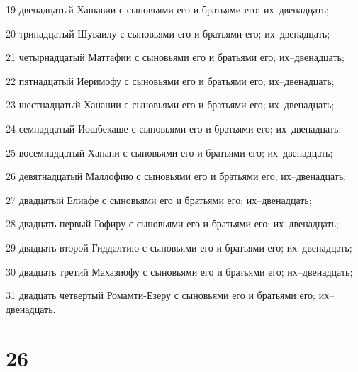 \par 19 двенадцатый Хашавии с сыновьями его и братьями его; их--двенадцать;
\par 20 тринадцатый Шуваилу с сыновьями его и братьями его; их--двенадцать;
\par 21 четырнадцатый Маттафии с сыновьями его и братьями его; их--двенадцать;
\par 22 пятнадцатый Иеримофу с сыновьями его и братьями его; их--двенадцать;
\par 23 шестнадцатый Ханании с сыновьями его и братьями его; их--двенадцать;
\par 24 семнадцатый Иошбекаше с сыновьями его и братьями его; их--двенадцать;
\par 25 восемнадцатый Ханани с сыновьями его и братьями его; их--двенадцать;
\par 26 девятнадцатый Маллофию с сыновьями его и братьями его; их--двенадцать;
\par 27 двадцатый Елиафе с сыновьями его и братьями его; их--двенадцать;
\par 28 двадцать первый Гофиру с сыновьями его и братьями его; их--двенадцать;
\par 29 двадцать второй Гиддалтию с сыновьями его и братьями его; их--двенадцать;
\par 30 двадцать третий Махазиофу с сыновьями его и братьями его; их--двенадцать;
\par 31 двадцать четвертый Ромамти-Езеру с сыновьями его и братьями его; их--двенадцать.

\chapter{26}

